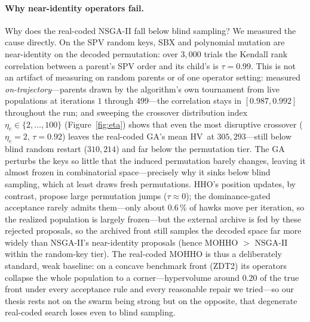 \documentclass[runningheads]{llncs}
\newcommand{\HV}{\textsf{HV}}
\begin{document}
\paragraph{Why near-identity operators fail.}
Why does the real-coded NSGA-II fall below blind sampling? We measured the cause directly. On the SPV random keys, SBX and polynomial mutation are near-identity on the decoded permutation: over $3{,}000$ trials the Kendall rank correlation between a parent's SPV order and its child's is $\tau=0.99$. This is not an artifact of measuring on random parents or of one operator setting: measured \emph{on-trajectory}---parents drawn by the algorithm's own tournament from live populations at iterations $1$ through $499$---the correlation stays in $[0.987,0.992]$ throughout the run; and sweeping the crossover distribution index $\eta_c\in\{2,\dots,100\}$ (Figure~\ref{fig:eta}) shows that even the most disruptive crossover ($\eta_c{=}2$, $\tau{=}0.92$) leaves the real-coded GA's mean \HV\ at $305{,}293$---still below blind random restart ($310{,}214$) and far below the permutation tier. The GA perturbs the keys so little that the induced permutation barely changes, leaving it almost frozen in combinatorial space---precisely why it sinks below blind sampling, which at least draws fresh permutations. HHO's position updates, by contrast, propose large permutation jumps ($\tau\approx0$); the dominance-gated acceptance rarely admits them---only about $0.6\,\%$ of hawks move per iteration, so the realized population is largely frozen---but the external archive is fed by these rejected proposals, so the archived front still samples the decoded space far more widely than NSGA-II's near-identity proposals (hence MOHHO $>$ NSGA-II within the random-key tier). The real-coded MOHHO is thus a deliberately standard, weak baseline: on a concave benchmark front (ZDT2) its operators collapse the whole population to a corner---hypervolume around $0.20$ of the true front under every acceptance rule and every reasonable repair we tried---so our thesis rests not on the swarm being strong but on the opposite, that degenerate real-coded search loses even to blind sampling.
\end{document}
